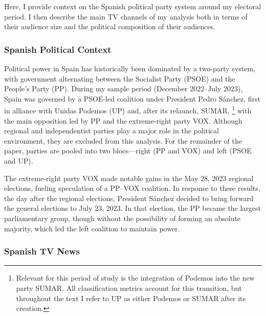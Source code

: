 \documentclass[12pt]{article}
\begin{document}
	
	
	Here, I provide context on the Spanish political party system around my electoral period. I then describe the main TV channels of my analysis both in terms of their audience size and  the political composition of their audiences. 
	
	
	
	
	\subsubsection*{Spanish Political Context}
	
	
	
	
	
	
	Political power in Spain has historically been dominated by a two-party system, with government alternating between the Socialist Party (PSOE) and the People’s Party (PP). During my sample period (December 2022–July 2023), Spain was governed by a PSOE-led coalition under President Pedro Sánchez, first in alliance with Unidas Podemos (UP) and, after its relaunch, SUMAR, \footnote{Relevant for this period of study is the integration of Podemos into the new party SUMAR. All classification metrics account for this transition, but throughout the text I refer to UP as either Podemos or SUMAR after its creation.} with the main opposition led by PP and the extreme-right party VOX. Although regional and independentist parties play a major role in the political environment, they are excluded from this analysis. For the remainder of the paper, parties are pooled into two blocs—right (PP and VOX) and left (PSOE and UP).
	
	
	The extreme-right party VOX made notable gains in the May 28, 2023 regional elections, fueling speculation of a PP–VOX coalition. In response to these results, the day after the regional elections, President Sánchez decided to bring forward the general elections to July 23, 2023. In that election, the PP became the largest parliamentary group, though without the possibility of forming an absolute majority, which led  the left coalition to maintain power. 
	
	
	
	
	
	
	
	
	
	
	\subsubsection*{Spanish TV News}
	
\end{document}
